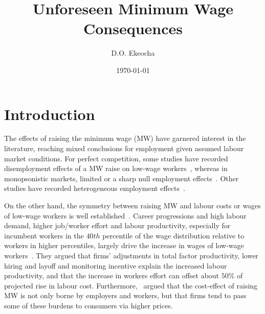 \documentclass[12pt, english]{article}
\title{{Unforeseen Minimum Wage Consequences}}
\author[1]{D.O. Ekeocha}
\affil[1]{
    University of Liverpool Management School
    \\ \texttt{davidmac.ekeocha@liverpool.ac.uk}
}
\date{\today}
\begin{document}
    \maketitle


    \section{Introduction}\label{sec:introduction}
    The effects of raising the minimum wage (MW) have garnered interest in the literature, reaching mixed conclusions for employment given assumed labour market conditions. For perfect competition, some studies have recorded disemployment effects of a MW raise on low-wage workers~\parencite{stigler1946economics, hamermesh1982minimum, neumark1992employment, brown1999minimum, machin2004minimum, neumark2000minimum, borjas2010labor}, whereas in monopsonistic markets, limited or a sharp null employment effects~\parencite{lester1960employment, card1993minimum, card2000minimum,aaronson2018industry, cengiz2019effect, wong2019minimum, dustmann2022reallocation}. Other studies have recorded heterogeneous employment effects~\parencite{okudaira2019minimum, medrano2023minimum, meer2023effects, gregory2022minimum}.

    On the other hand, the symmetry between raising MW and labour costs or wages of low-wage workers is well established~\parencite{medrano2023minimum,clemens2023important}. Career progressions and high labour demand, higher job/worker effort and labour productivity, especially for incumbent workers in the $40th$ percentile of the wage distribution relative to workers in higher percentiles, largely drive the increase in wages of low-wage workers~\parencite{riley2017raising, kim2019minimum, wong2019minimum, baek2021impact, zhao2021effects, seok2022macroeconomic, ku2022does, coviello2022minimum, alexandre2022minimum}. They argued that firms' adjustments in total factor productivity, lower hiring and layoff and monitoring incentive explain the increased labour productivity, and that the increase in workers effort can offset about $50\%$ of projected rise in labour cost. Furthermore,~\cite{harasztosi2019pays} argued that the cost-effect of raising MW is not only borne by employers and workers, but that firms tend to pass some of these burdens to consumers via higher prices.
\end{document}

